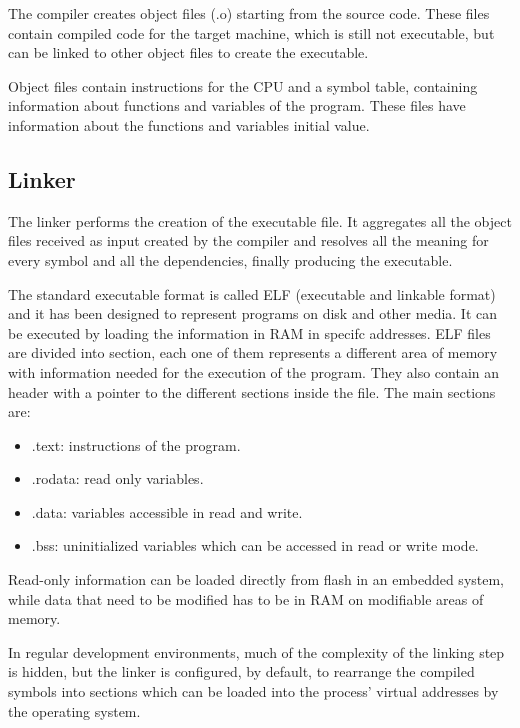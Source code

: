 The compiler creates object files (.o) starting from the source code.
These files contain compiled code for the target machine, which is still not
executable, but can be linked to other object files to create the executable.

Object files contain instructions for the CPU and a symbol table, containing
information about functions and variables of the program.
These files have information about the functions and variables initial value.

\subsection{Linker}

The linker performs the creation of the executable file. It aggregates all the
object files received as input created by the compiler and resolves all the
meaning for every symbol and all the dependencies, finally producing the
executable.

The standard executable format is called ELF (executable and linkable format)
and it has been designed to represent programs on disk and other media.
It can be executed by loading the information in RAM in specifc addresses.
ELF files are divided into section, each one of them represents a different
area of memory with information needed for the execution of the program.
They also contain an header with a pointer to the different sections inside
the file.
The main sections are:

\begin{itemize}
    \item .text: instructions of the program.
    \item .rodata: read only variables.
    \item .data: variables accessible in read and write.
    \item .bss: uninitialized variables which can be accessed in read or write
                mode.
\end{itemize}

Read-only information can be loaded directly from flash in an embedded system,
while data that need to be modified has to be in RAM on modifiable areas of
memory.

In regular development environments, much of the complexity of the linking 
step is hidden, but the linker is configured, by default, to rearrange the
compiled symbols into sections which can be loaded into the process' virtual
addresses by the operating system.

